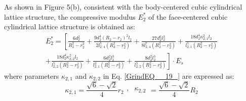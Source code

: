 \documentclass{article} %
\begin{document}
As shown in Figure 5(b), consistent with the body-centered cubic cylindrical lattice structure, the compressive modulus $E_{2}^{*} $ of the face-centered cubic cylindrical lattice structure is obtained as:
\begin{equation} \label{GrindEQ__19_} 
\begin{array}{l} {E_{2}^{*} =\left[\frac{6d_{2}^{2} }{R_{2}^{2} -r_{2}^{2} } +\frac{9d_{2}^{4} \left(R_{2} -r_{2} \right)^{2} l_{2} }{2l_{2,4}^{5} \left(R_{2}^{2} -r_{2}^{2} \right)} +\frac{27d_{2}^{6} l_{2}^{3} }{8l_{2,4}^{7} \left(R_{2}^{2} -r_{2}^{2} \right)} +\frac{18d_{2}^{4} \kappa _{2,1}^{2} l_{2} }{l_{2,1}^{5} \left(R_{2}^{2} -r_{2}^{2} \right)} \right. } \\ {+\frac{18d_{2}^{4} \kappa _{2,2}^{2} l_{2} }{l_{2,2}^{5} \left(R_{2}^{2} -r_{2}^{2} \right)} +\frac{6d_{2}^{2} l_{2}^{3} }{l_{2,1}^{3} \left(R_{2}^{2} -r_{2}^{2} \right)} +\left. \frac{8d_{2}^{2} l_{2}^{3} }{l_{2,2}^{3} \left(R_{2}^{2} -r_{2}^{2} \right)} \right]\cdot E_{s} } \end{array} 
\end{equation} 
where parameters $\kappa _{2,1} $ and $\kappa _{2,2} $ in Eq. \eqref{GrindEQ__19_} are expressed as:
\[\kappa _{2,1} =\frac{\sqrt{6} -\sqrt{2} }{4} r_{2} \begin{array}{cc} {,} & {\kappa _{2,2} } \end{array}=\frac{\sqrt{6} -\sqrt{2} }{4} R_{2} \] 
\end{document}
